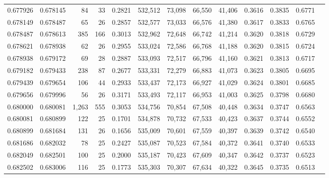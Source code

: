 \begin{tabular}{rrrrrrrrrrrrr}
0.677926 & 0.678145 &    84 &  33 &                                     0.2821 & 532,512 &  73,098 &  66,550 &  41,406 & 0.3616 & 0.3835 & 0.6771 \\
0.678149 & 0.678487 &    65 &  26 &                                     0.2857 & 532,577 &  73,033 &  66,576 &  41,380 & 0.3617 & 0.3833 & 0.6765 \\
0.678487 & 0.678613 &   385 & 166 &                                     0.3013 & 532,962 &  72,648 &  66,742 &  41,214 & 0.3620 & 0.3818 & 0.6729 \\
0.678621 & 0.678938 &    62 &  26 &                                     0.2955 & 533,024 &  72,586 &  66,768 &  41,188 & 0.3620 & 0.3815 & 0.6724 \\
0.678938 & 0.679172 &    69 &  28 &                                     0.2887 & 533,093 &  72,517 &  66,796 &  41,160 & 0.3621 & 0.3813 & 0.6717 \\
0.679182 & 0.679433 &   238 &  87 &                                     0.2677 & 533,331 &  72,279 &  66,883 &  41,073 & 0.3623 & 0.3805 & 0.6695 \\
0.679439 & 0.679654 &   106 &  44 &                                     0.2933 & 533,437 &  72,173 &  66,927 &  41,029 & 0.3624 & 0.3801 & 0.6685 \\
0.679656 & 0.679996 &    56 &  26 &                                     0.3171 & 533,493 &  72,117 &  66,953 &  41,003 & 0.3625 & 0.3798 & 0.6680 \\
0.680000 & 0.680081 & 1,263 & 555 &                                     0.3053 & 534,756 &  70,854 &  67,508 &  40,448 & 0.3634 & 0.3747 & 0.6563 \\
0.680081 & 0.680899 &   122 &  25 &                                     0.1701 & 534,878 &  70,732 &  67,533 &  40,423 & 0.3637 & 0.3744 & 0.6552 \\
0.680899 & 0.681684 &   131 &  26 &                                     0.1656 & 535,009 &  70,601 &  67,559 &  40,397 & 0.3639 & 0.3742 & 0.6540 \\
0.681686 & 0.682032 &    78 &  25 &                                     0.2427 & 535,087 &  70,523 &  67,584 &  40,372 & 0.3641 & 0.3740 & 0.6533 \\
0.682049 & 0.682501 &   100 &  25 &                                     0.2000 & 535,187 &  70,423 &  67,609 &  40,347 & 0.3642 & 0.3737 & 0.6523 \\
0.682502 & 0.683006 &   116 &  25 &                                     0.1773 & 535,303 &  70,307 &  67,634 &  40,322 & 0.3645 & 0.3735 & 0.6513 \\

\end{tabular}
